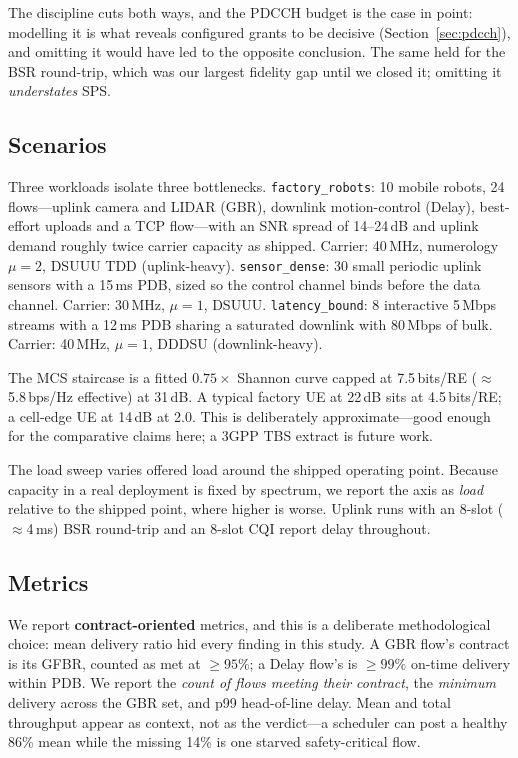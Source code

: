 \documentclass[conference]{IEEEtran}
\begin{document}
The discipline cuts both ways, and the PDCCH budget is the case in point:
modelling it is what reveals configured grants to be decisive
(Section~\ref{sec:pdcch}), and omitting it would have led to the opposite
conclusion. The same held for the BSR round-trip, which was our largest
fidelity gap until we closed it; omitting it \emph{understates} SPS.

\subsection{Scenarios}
Three workloads isolate three bottlenecks. \texttt{factory\_robots}: 10
mobile robots, 24 flows---uplink camera and LIDAR (GBR), downlink
motion-control (Delay), best-effort uploads and a TCP flow---with an SNR
spread of 14--24\,dB and uplink demand roughly twice carrier capacity as
shipped. Carrier: 40\,MHz, numerology $\mu=2$, DSUUU TDD (uplink-heavy).
\texttt{sensor\_dense}: 30 small periodic uplink sensors with a 15\,ms
PDB, sized so the control channel binds before the data channel.
Carrier: 30\,MHz, $\mu=1$, DSUUU. \texttt{latency\_bound}: 8 interactive
5\,Mbps streams with a 12\,ms PDB sharing a saturated downlink with
80\,Mbps of bulk. Carrier: 40\,MHz, $\mu=1$, DDDSU (downlink-heavy).

The MCS staircase is a fitted $0.75\times$ Shannon curve capped at
7.5\,bits/RE ($\approx$5.8\,bps/Hz effective) at 31\,dB. A typical
factory UE at 22\,dB sits at 4.5\,bits/RE; a cell-edge UE at 14\,dB at
2.0. This is deliberately approximate---good enough for the
comparative claims here; a 3GPP TBS extract is future work.

The load sweep varies offered load around the shipped operating point.
Because capacity in a real deployment is fixed by spectrum, we report the
axis as \emph{load} relative to the shipped point, where higher is worse.
Uplink runs with an 8-slot ($\approx$4\,ms) BSR round-trip and an 8-slot
CQI report delay throughout.

\subsection{Metrics}
We report \textbf{contract-oriented} metrics, and this is a deliberate
methodological choice: mean delivery ratio hid every finding in this study.
A GBR flow's contract is its GFBR, counted as met at $\ge 95\%$; a Delay
flow's is $\ge 99\%$ on-time delivery within PDB. We report the
\emph{count of flows meeting their contract}, the \emph{minimum} delivery
across the GBR set, and p99 head-of-line delay. Mean and total throughput
appear as context, not as the verdict---a scheduler can post a healthy 86\%
mean while the missing 14\% is one starved safety-critical flow.
\end{document}

